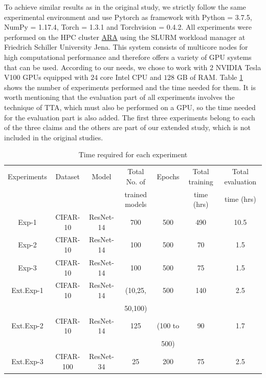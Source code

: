 To achieve similar results as in the original study, we strictly follow the same experimental environment and use Pytorch as framework with Python = 3.7.5, NumPy = 1.17.4, Torch = 1.3.1 and Torchvision = 0.4.2. All experiments were performed on the HPC cluster \href{https://wiki.uni-jena.de/pages/viewpage.action?pageId=22453005}{ARA} using the SLURM workload manager at Friedrich Schiller University Jena. This system consists of multicore nodes for high computational performance and therefore offers a variety of GPU systems that can be used. According to our needs, we chose to work with $2$ NVIDIA Tesla V100 GPUs equipped with $24$ core Intel CPU and $128$ GB of RAM. Table \ref{table:table3} shows the number of experiments performed and the time needed for them. It is worth mentioning that the evaluation part of all experiments involves the technique of TTA, which must also be performed on a GPU, so the time needed for the evaluation part is also added. The first three experiments belong to each of the three claims and the others are part of our extended study, which is not included in the original studies.

\begin{table}[!htb]
\centering
	\begin{tabular}{|c|c|c|c|c|c|c|}
	\hline
    Experiments & Dataset & Model & Total No. of& Epochs & Total training & Total evaluation \\
    & & & trained models & & time (hrs)& time (hrs)\\
	\hline
		Exp-1 & CIFAR-10 & ResNet-14 & 700 & 500 & 490 & 10.5 \\
		Exp-2 & CIFAR-10 & ResNet-14 & 100 & 500 & 70  & 1.5\\
	    Exp-3 & CIFAR-10 & ResNet-14 & 100 & 500 & 75  & 1.5\\
	    Ext.Exp-1 & CIFAR-10 & ResNet-14 & (10,25, & 500 & 140 & 2.5\\
	    & & & 50,100)& & & \\
	    Ext.Exp-2 & CIFAR-10 & ResNet-14 & 125 & (100 to & 90  & 1.7\\
	    & & & & 500) & & \\
	    Ext.Exp-3 & CIFAR-100 & ResNet-34 & 25 & 200 & 75  & 2.5\\
		\hline
	\end{tabular}
	\caption{Time required for each experiment}
	\label{table:table3}
\end{table}

\newpage

